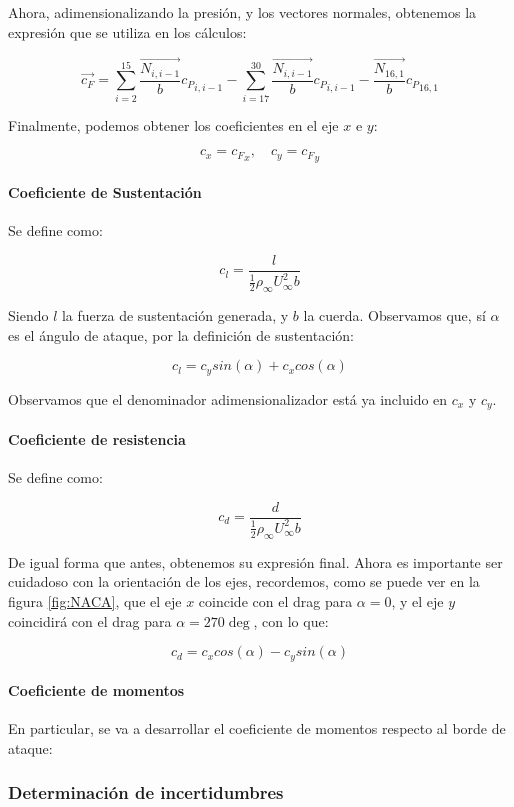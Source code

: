 \documentclass{article}
\begin{document}
Ahora, adimensionalizando la presión, y los vectores normales, obtenemos la expresión que se utiliza en los cálculos:

$$\vec{c_F} = \sum_{i = 2}^{15} \frac{\vec{N_{i, i-1}}}{b} {c_P}_{i, i-1} - 
\sum_{i=17}^{30} \frac{\vec{N_{i, i-1}}}{b} {c_P}_{i, i-1} -
\frac{\vec{N_{16, 1}}}{b} {c_P}_{16, 1} $$

Finalmente, podemos obtener los coeficientes en el eje $x$ e $y$:

$$c_x = {c_F}_x, \quad c_y = {c_F}_y$$

\paragraph{Coeficiente de Sustentación}

Se define como:

$$c_l = \frac{l}{\frac{1}{2} \rho_{\infty} U_{\infty}^2 b}$$

Siendo $l$ la fuerza de sustentación generada, y $b$ la cuerda. Observamos que, sí $\alpha$ es el ángulo de ataque, por la 
definición de sustentación:

$$c_l = c_y sin(\alpha) + c_x cos(\alpha)$$

Observamos que el denominador adimensionalizador está ya incluido en $c_x$ y $c_y$. 

\paragraph{Coeficiente de resistencia}

Se define como:

$$c_d = \frac{d}{\frac{1}{2} \rho_{\infty} U_{\infty}^2 b}$$

De igual forma que antes, obtenemos su expresión final. Ahora es importante ser cuidadoso con la orientación de los ejes,
recordemos, como se puede ver en la figura \ref{fig:NACA}, que el eje $x$ coincide con el drag para $\alpha=0$, y
el eje $y$ coincidirá con el drag para $\alpha=270\deg$, con lo que:

$$c_d = c_x cos(\alpha) - c_y sin(\alpha)$$

\paragraph{Coeficiente de momentos}

En particular, se va a desarrollar el coeficiente de momentos respecto al borde de ataque:

\subsubsection{Determinación de incertidumbres}
\end{document}

